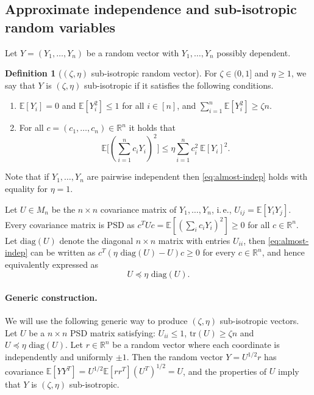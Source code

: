 \documentclass[11pt]{article}
\newcommand{\E}{\mathbb{E}}
\theoremstyle{definition}
\newtheorem{definition}[theorem]{Definition}
\newcommand{\R}{{\mathbb R}}
\newcommand{\ie}{i.\,e.}
\begin{document}
\subsection{Approximate independence and  sub-isotropic random variables}
Let $Y=(Y_1,\ldots,Y_n)$ be a random vector with $Y_1,\ldots,Y_n$ possibly dependent.
\begin{definition}[$(\zeta,\eta)$ sub-isotropic random vector] For $ \zeta \in (0,1]$ and $ \eta \geq 1$, we say that $Y$ is $(\zeta,\eta)$ sub-isotropic if it satisfies the following conditions.
\begin{enumerate}
\item $\E[Y_i]=0$ and $\E[Y_i^2 ] \leq 1$ for all $i \in [n]$, and $\sum_{i=1}^n  \E[Y_i^2] \geq \zeta n$.
\item For all $c = (c_1,\ldots,c_n) \in \R^n$ it holds that
\begin{equation}
\label{eq:almost-indep}
     \E \Big[( \sum_{i=1}^n c_i Y_i)^2   \Big] \leq \eta \sum_{i=1}^n c_i^2 \ \E[Y_i]^2.
\end{equation}
\end{enumerate}
\end{definition}
Note that if $Y_1,\ldots,Y_n$ are pairwise independent then \eqref{eq:almost-indep} holds with equality for $\eta =1$.

Let $U \in M_n$ be the $n\times n$ covariance matrix of $Y_1,\ldots,Y_n$, \ie,
$U_{ij} = \E[Y_i Y_j]$. Every covariance matrix is PSD as
$ c^T U c =\E[ (\sum_i c_i Y_i)^2 ] \geq 0$ for all $c \in \R^n$.
Let $\text{diag}(U)$ denote the diagonal $n\times n$ matrix with entries $U_{ii}$, then
\eqref{eq:almost-indep} can be written as $c^T (\eta \text{ diag}(U) - U ) c \geq 0$ for every $c \in \R^n$, and hence
equivalently expressed as
\[  U \preceq \eta  \text{ diag}(U).\]


%
\paragraph{Generic construction.}   %
We will use the following generic way to produce $(\zeta,\eta)$ sub-isotropic vectors. Let $U$ be a $n\times n$ PSD matrix satisfying: $U_{ii} \leq 1$, $\text{tr}(U) \geq \zeta n$ and $ U \preceq \eta \text{ diag}(U)$. Let $r \in \R^n$ be  a random vector where each coordinate is independently and uniformly $\pm 1$. Then the random vector 
$Y = U^{1/2}r$ has covariance $\E[YY^T]= U^{1/2} \E[rr^T] (U^T)^{1/2} = U$, and the properties of $U$ imply that $Y$ 
is $(\zeta,\eta)$ sub-isotropic.
\end{document}
